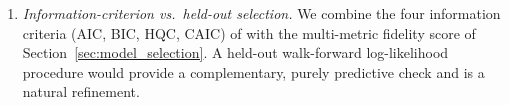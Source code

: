 \begin{enumerate}
    \item \textit{Information-criterion vs.\ held-out selection.}
    We combine the four information criteria (AIC, BIC, HQC, CAIC) of \citet{nguyen2018hidden} with the multi-metric fidelity score of Section~\ref{sec:model_selection}.
    A held-out walk-forward log-likelihood procedure would provide a complementary, purely predictive check and is a natural refinement.
\end{enumerate}
